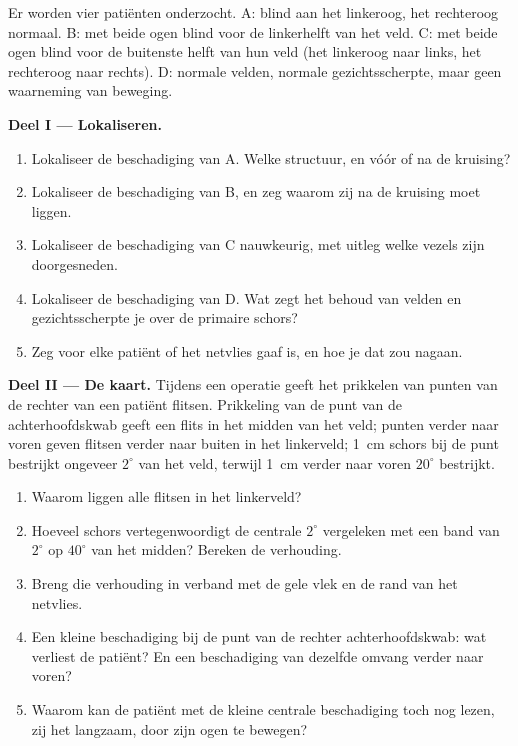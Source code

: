 \begin{problem}
\label{pb:g11:vision-and-brain:1}
Er worden vier patiënten onderzocht. A: blind aan het linkeroog, het
rechteroog normaal. B: met beide ogen blind voor de linkerhelft van het
veld. C: met beide ogen blind voor de buitenste helft van hun veld (het
linkeroog naar links, het rechteroog naar rechts). D: normale velden,
normale gezichtsscherpte, maar geen waarneming van beweging.

\medskip
\noindent\textbf{Deel I --- Lokaliseren.}
\begin{enumerate}
  \item Lokaliseer de beschadiging van A. Welke structuur, en vóór of na
        de kruising?
  \item Lokaliseer de beschadiging van B, en zeg waarom zij na de
        kruising moet liggen.
  \item Lokaliseer de beschadiging van C nauwkeurig, met uitleg welke
        vezels zijn doorgesneden.
  \item Lokaliseer de beschadiging van D. Wat zegt het behoud van velden
        en gezichtsscherpte je over de primaire schors?
  \item Zeg voor elke patiënt of het netvlies gaaf is, en hoe je dat zou
        nagaan.
\end{enumerate}

\medskip
\noindent\textbf{Deel II --- De kaart.}
Tijdens een operatie geeft het prikkelen van punten van de rechter  van een patiënt flitsen. Prikkeling van de punt van de
achterhoofdskwab geeft een flits in het midden van het veld; punten verder
naar voren geven flitsen verder naar buiten in het linkerveld;
\qty{1}{cm} schors bij de punt bestrijkt ongeveer $2^\circ$ van het veld,
terwijl \qty{1}{cm} verder naar voren $20^\circ$ bestrijkt.
\begin{enumerate}[resume]
  \item Waarom liggen alle flitsen in het linkerveld?
  \item Hoeveel schors vertegenwoordigt de centrale $2^\circ$ vergeleken
        met een band van $2^\circ$ op $40^\circ$ van het midden? Bereken
        de verhouding.
  \item Breng die verhouding in verband met de gele vlek en de rand van
        het netvlies.
  \item Een kleine beschadiging bij de punt van de rechter
        achterhoofdskwab: wat verliest de patiënt? En een beschadiging van
        dezelfde omvang verder naar voren?
  \item Waarom kan de patiënt met de kleine centrale beschadiging toch
        nog lezen, zij het langzaam, door zijn ogen te bewegen?
\end{enumerate}


\end{problem}
